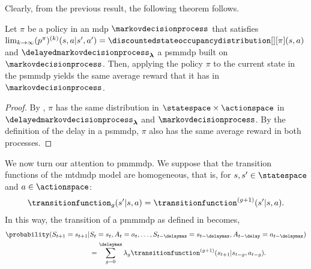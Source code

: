 Clearly, from the previous result, the following theorem follows.
\begin{thm}
\label{th:psmmdp_same}
    Let $\pi$ be a policy in an \gls{mdp} $\markovdecisionprocess$ that satisfies $\lim_{k\rightarrow\infty}(p^\pi)^{(k)}(s,a\vert s',a')= \discountedstateoccupancydistribution[][\pi](s,a)$ and $\delayedmarkovdecisionprocess_{\boldsymbol{\lambda}}$ a \gls{psmmdp} built on $\markovdecisionprocess$.
    Then, applying the policy $\pi$ to the current state in the \gls{psmmdp} yields the same average reward that it has in $\markovdecisionprocess$.
\end{thm}
\begin{proof}
    By , $\pi$ has the same distribution in $\statespace\times\actionspace$ in $\delayedmarkovdecisionprocess_{\boldsymbol{\lambda}}$ and $\markovdecisionprocess$. 
    By the definition of the delay in a \gls{psmmdp}, $\pi$ also has the same average reward in both processes.
\end{proof}

We now turn our attention to \gls{pmmmdp}. 
We suppose that the transition functions of the \gls{mtdmdp} model are homogeneous, that is, for $s,s'\in\statespace$ and $a\in\actionspace$:
\begin{align*}
    \transitionfunction_g(s'\vert s,a)=\transitionfunction^{(g+1)}(s'\vert s,a).
\end{align*}
In this way, the transition of a \gls{pmmmdp} as defined in  becomes,
\begin{align*}
    \probability(S_{t+1}=s_{t+1}\vert& S_{t}=s_{t},A_{t}=a_{t},\dots,S_{t-\delaymax}=s_{t-\delaymax},A_{t-\delay}=a_{t-\delaymax})
    \\
    &= \sum_{g=0}^\delaymax \lambda_g \transitionfunction^{(g+1)}(s_{t+1}\vert s_{t-g},a_{t-g}).
\end{align*}

